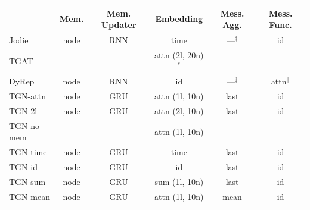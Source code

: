 \documentclass{article}
\begin{document}
\begin{table}[h!]
  \label{tab:models}
  \centering
  \begin{tabular}{lccccc}
    \toprule
              & Mem.          & Mem. Updater           & Embedding             & Mess. Agg.                               &  Mess. Func.    \\
    \midrule
    Jodie          & node     & RNN                    & time                  & \hspace{1.5mm}---$^\dagger$\hspace{0mm}  & id              \\ 
    TGAT           & ---      & ---                    & attn (2l, 20n)$^*$    & ---                                      & ---             \\
    DyRep          & node     & RNN                    & id                    & \hspace{1.5mm}---$^\ddagger$\hspace{0mm} & \hspace{1.5mm}attn$^\|$\hspace{0mm}        \\ \hline 
    TGN-attn       & node     & GRU                    & attn (1l, 10n)        & last                                     & id              \\
    TGN-2l         & node     & GRU                    & attn (2l, 10n)        & last                                     & id              \\
    TGN-no-mem     & ---      & ---                    & attn (1l, 10n)        & ---                                      & ---             \\
    TGN-time       & node     & GRU                    & time                  & last                                     & id              \\
    TGN-id         & node     & GRU                    & id                    & last                                     & id              \\
    TGN-sum        & node     & GRU                    & sum  (1l, 10n)        & last                                     & id              \\
    TGN-mean       & node     & GRU                    & attn (1l, 10n)        & mean                                     & id              \\
    \bottomrule
  \end{tabular}\vspace{-2mm}
\end{table}
\end{document}
